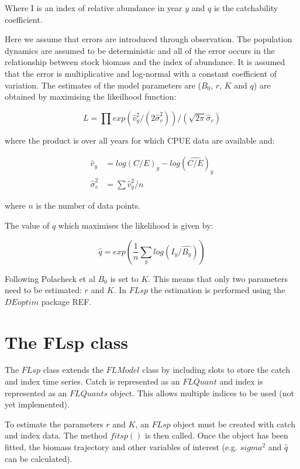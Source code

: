 \documentclass[a4paper]{article}
\begin{document}
Where I is an index of relative abundance in year $y$ and $q$ is the catchability coefficient.

Here we assume that errors are introduced through observation. The population dynamics are assumed to be deterministic and all of the error occurs in the relationship between stock biomass and the index of abundance.
It is assumed that the error is multiplicative and log-normal with a constant coefficient of variation. The estimates of the model parameters are ($B_0$, $r$, $K$ and $q$) are obtained by maximising the likeilhood function:

\begin{equation}
L = \prod exp(\hat{v}_y^2 / (2\hat{\sigma}^2_v)) / (\sqrt{2\pi}\hat{\sigma}_v)
\end{equation}

where the product is over all years for which CPUE data are available and:

\begin{align}
\hat{v}_y &= log(C/E)_y - log(\hat{C/E})_y \\
\hat{\sigma}^2_v &= \sum\hat{v}_y^2 / n
\end{align}

where $n$ is the number of data points.

The value of $q$ which maximises the likelihood is given by:

\begin{equation}
\hat{q} = exp\left(\frac{1}{n} \sum_{y} log(I_y/\hat{B_y})\right)
\end{equation}

Following Polacheck et al $B_0$ is set to $K$. This means that only two parameters need to be estimated: $r$ and $K$.
In $FLsp$ the estimation is performed using the $DEoptim$ package REF.

\section{The FLsp class}

The $FLsp$ class extends the $FLModel$ class by including slots to store the catch and index time series. Catch is represented as an $FLQuant$ and index is represented as an $FLQuants$ object. This allows multiple indices to be used (not yet implemented).

To estimate the parameters $r$ and $K$, an $FLsp$ object must be created with catch and index data. The method $fitsp()$ is then called.
Once the object has been fitted, the biomass trajectory and other variables of interest (e.g. $sigma^2$ and $\hat{q}$ can be calculated).
\end{document}
